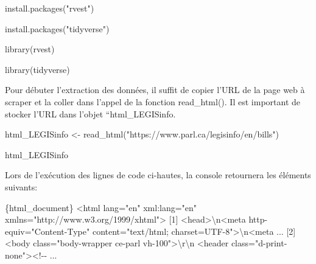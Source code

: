\documentclass[
  letterpaper,
  DIV=11,
  numbers=noendperiod]{scrreprt}
\newenvironment{Shaded}{\begin{snugshade}}{\end{snugshade}}
\newcommand{\DataTypeTok}[1]{\textcolor[rgb]{0.68,0.00,0.00}{#1}}
\newcommand{\ErrorTok}[1]{\textcolor[rgb]{0.68,0.00,0.00}{#1}}
\newcommand{\ExtensionTok}[1]{\textcolor[rgb]{0.00,0.23,0.31}{#1}}
\newcommand{\KeywordTok}[1]{\textcolor[rgb]{0.00,0.23,0.31}{#1}}
\newcommand{\NormalTok}[1]{\textcolor[rgb]{0.00,0.23,0.31}{#1}}
\newcommand{\OperatorTok}[1]{\textcolor[rgb]{0.37,0.37,0.37}{#1}}
\newcommand{\StringTok}[1]{\textcolor[rgb]{0.13,0.47,0.30}{#1}}
\newcommand{\VariableTok}[1]{\textcolor[rgb]{0.07,0.07,0.07}{#1}}
\begin{document}
\begin{Shaded}
\begin{Highlighting}[]
\ExtensionTok{install.packages}\ErrorTok{(}\StringTok{"rvest"}\KeywordTok{)}

\ExtensionTok{install.packages}\ErrorTok{(}\StringTok{"tidyverse"}\KeywordTok{)}

\ExtensionTok{library}\ErrorTok{(}\ExtensionTok{rvest}\KeywordTok{)}

\ExtensionTok{library}\ErrorTok{(}\ExtensionTok{tidyverse}\KeywordTok{)}
\end{Highlighting}
\end{Shaded}

Pour débuter l'extraction des données, il suffit de copier l'URL de la
page web à scraper et la coller dans l'appel de la fonction
read\_html(). Il est important de stocker l'URL dans l'objet
``html\_LEGISinfo.

\begin{Shaded}
\begin{Highlighting}[]
\ExtensionTok{html\_LEGISinfo} \OperatorTok{\textless{}}\NormalTok{{-} read\_html}\ErrorTok{(}\StringTok{"https://www.parl.ca/legisinfo/en/bills"}\KeywordTok{)}

\ExtensionTok{html\_LEGISinfo}
\end{Highlighting}
\end{Shaded}

Lors de l'exécution des lignes de code ci-hautes, la console retournera
les éléments suivants:

\begin{Shaded}
\begin{Highlighting}[]
\ExtensionTok{\{html\_document\}}
\OperatorTok{\textless{}}\NormalTok{html }\VariableTok{lang}\OperatorTok{=}\StringTok{"en"} \ExtensionTok{xml:lang=}\StringTok{"en"}\NormalTok{ xmlns=}\StringTok{"http://www.w3.org/1999/xhtml"}\OperatorTok{\textgreater{}}
\ExtensionTok{[1]} \OperatorTok{\textless{}}\NormalTok{head}\OperatorTok{\textgreater{}}\DataTypeTok{\textbackslash{}n}\OperatorTok{\textless{}}\NormalTok{meta http{-}equiv=}\StringTok{"Content{-}Type"}\NormalTok{ content=}\StringTok{"text/html;         charset=UTF{-}8"}\OperatorTok{\textgreater{}}\DataTypeTok{\textbackslash{}n}\OperatorTok{\textless{}}\NormalTok{meta  ...}
\ExtensionTok{[2]} \OperatorTok{\textless{}}\NormalTok{body class=}\StringTok{"body{-}wrapper ce{-}parl vh{-}100"}\OperatorTok{\textgreater{}}\DataTypeTok{\textbackslash{}r\textbackslash{}n}    \OperatorTok{\textless{}}\NormalTok{header class=}\StringTok{"d{-}print{-}none"}\OperatorTok{\textgreater{}\textless{}}\NormalTok{!{-}{-} ...}
\end{Highlighting}
\end{Shaded}
\end{document}
